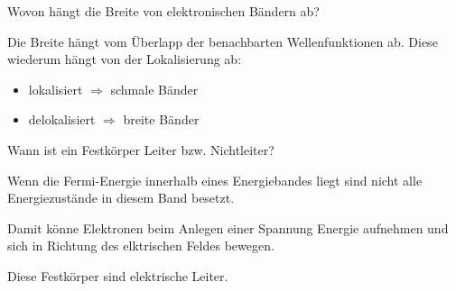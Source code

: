 \documentclass[a5paper,12pt,ngerman,grid=front %
,print
]{kartei}
\begin{document}
	\begin{karte}{
		Wovon hängt die Breite von elektronischen Bändern ab?
		}
		
		Die Breite hängt vom Überlapp der benachbarten Wellenfunktionen ab. Diese wiederum hängt von der Lokalisierung ab:
		\begin{itemize}
			\item lokalisiert $\Rightarrow$ schmale Bänder
			\item delokalisiert $\Rightarrow$ breite Bänder
		\end{itemize}
		
	\end{karte}


	\begin{karte}{
		Wann ist ein Festkörper Leiter bzw. Nichtleiter?
		}
		
		Wenn die Fermi-Energie innerhalb eines Energiebandes liegt sind nicht alle Energiezustände in diesem Band besetzt.
		
		Damit könne Elektronen beim Anlegen einer Spannung Energie aufnehmen und sich in Richtung des elktrischen Feldes bewegen.
		
		Diese Festkörper sind elektrische Leiter.
		
	\end{karte}

\end{document}
